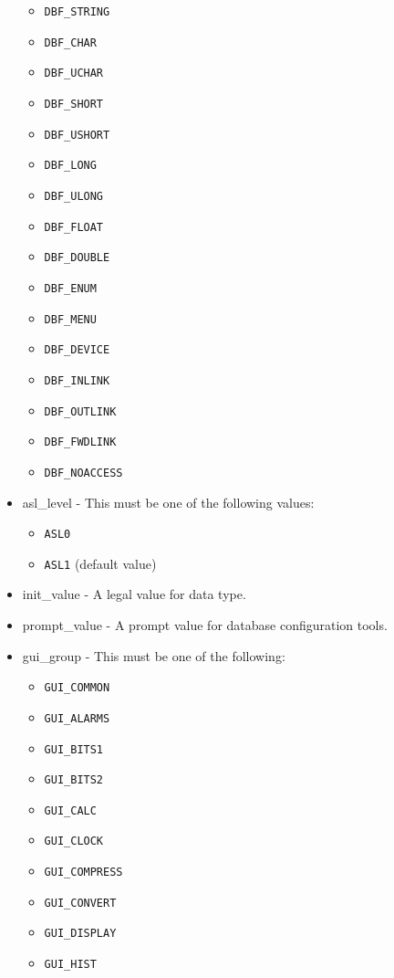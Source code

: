 \begin{itemize}
\begin{itemize}
\item \verb|DBF_STRING|
\item \verb|DBF_CHAR|
\item \verb|DBF_UCHAR|
\item \verb|DBF_SHORT|
\item \verb|DBF_USHORT|
\item \verb|DBF_LONG|
\item \verb|DBF_ULONG|
\item \verb|DBF_FLOAT|
\item \verb|DBF_DOUBLE|
\item \verb|DBF_ENUM|
\item \verb|DBF_MENU|
\item \verb|DBF_DEVICE|
\item \verb|DBF_INLINK|
\item \verb|DBF_OUTLINK|
\item \verb|DBF_FWDLINK|
\item \verb|DBF_NOACCESS|
\end{itemize}
\item {}asl\_level - This must be one of the following values:
\begin{itemize}
\item \verb|ASL0|
\item \verb|ASL1|  (default value)
\end{itemize}
\item {}init\_value - A legal value for data type.
\item {}prompt\_value - A prompt value for database configuration tools.
\item {}gui\_group - This must be one of the following:
\begin{itemize}
\item \verb|GUI_COMMON|
\item \verb|GUI_ALARMS|
\item \verb|GUI_BITS1|
\item \verb|GUI_BITS2|
\item \verb|GUI_CALC|
\item \verb|GUI_CLOCK|
\item \verb|GUI_COMPRESS|
\item \verb|GUI_CONVERT|
\item \verb|GUI_DISPLAY|
\item \verb|GUI_HIST|

\end{itemize}
\end{itemize}
